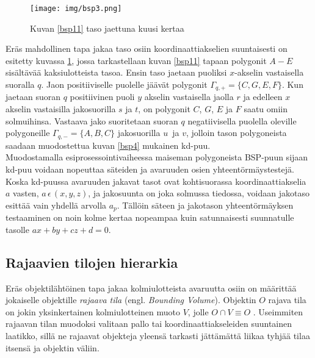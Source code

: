 \documentclass[a4paper, 12pt, titlepage]{article}
\begin{document}
\begin{figure}
 \centering 
 \texttt{[image: img/bsp3.png]}
 \vspace{0.4cm}
 \caption{Kuvan \ref{bsp11} taso jaettuna kuusi kertaa}
 \label{bsp3}
\end{figure}


Eräs mahdollinen tapa jakaa taso osiin koordinaattiakselien suuntaisesti on esitetty kuvassa \ref{bsp3}, jossa tarkastellaan kuvan \ref{bsp11} tapaan polygonit $A-E$ sisältävää kaksiulotteista tasoa. Ensin taso jaetaan puoliksi $x$-akselin vastaisella suoralla $q$. Jaon positiiviselle puolelle jäävät polygonit $\Gamma_{q,+} = \{C,G,E,F\}$. Kun jaetaan suoran $q$ positiivinen puoli $y$ akselin vastaisella jaolla $r$ ja edelleen $x$ akselin vastaisilla jakosuorilla $s$ ja $t$, on polygonit $C$, $G$, $E$ ja $F$ saatu omiin solmuihinsa. Vastaava jako suoritetaan suoran $q$ negatiivisella puolella oleville polygoneille $\Gamma_{q,-} = \{A,B,C\}$ jakosuorilla $u$ ja $v$, jolloin tason polygoneista saadaan muodostettua kuvan \ref{bsp4} mukainen kd-puu.\\ 



Muodostamalla esiprosessointivaiheessa maiseman polygoneista BSP-puun sijaan kd-puu voidaan nopeuttaa säteiden ja avaruuden osien yhteentörmäystestejä. Koska kd-puussa avaruuden jakavat tasot ovat kohtisuorassa koordinaattiakselia $a$ vasten, $a\,\epsilon\,(x, y, z)$, ja jakosuunta on joka solmussa tiedossa, voidaan jakotaso esittää vain yhdellä arvolla $a_p$. Tällöin säteen ja jakotason yhteentörmäyksen testaaminen on noin kolme kertaa nopeampaa kuin satunnaisesti suunnatulle tasolle $ax + by + cz + d = 0$. \citep[.]{havran}\\
 
\subsection{Rajaavien tilojen hierarkia}

Eräs objektilähtöinen tapa jakaa kolmiulotteista avaruutta osiin on määrittää jokaiselle objektille \emph{rajaava tila} (engl. \emph{Bounding Volume}). Objektin $O$ rajava tila on jokin yksinkertainen kolmiulotteinen muoto $V$, jolle $O \cap V \equiv O$ \citep{havran}. Useimmiten rajaavan tilan muodoksi valitaan pallo tai koordinaattiakseleiden suuntainen laatikko, sillä ne rajaavat objekteja yleensä tarkasti jättämättä liikaa tyhjää tilaa itsensä ja objektin väliin. \citep{hughes} \\
\end{document}
